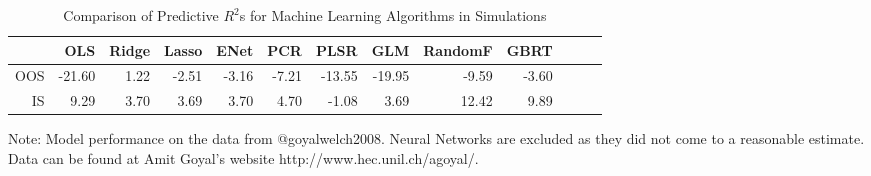 \documentclass{article}
\begin{document}
\begin{table}[ht]
\begin{threeparttable}
\centering
\setlength{\tabcolsep}{12pt}
\caption{Comparison of Predictive $R^2$s for Machine Learning Algorithms in Simulations}
\begin{tabular}{rrrrrrrrrrrrr}
  \hline
 & OLS & Ridge & Lasso & ENet & PCR & PLSR & GLM & RandomF & GBRT\\ 
  \hline
OOS & -21.60 & 1.22 & -2.51 & -3.16 & -7.21 & -13.55 & -19.95 & -9.59 & -3.60 \\
IS & 9.29 & 3.70 & 3.69 & 3.70 & 4.70 & -1.08 & 3.69 & 12.42 & 9.89  \\ 
   \hline
\end{tabular}
\begin{tablenotes}
      \small
      \item Note: Model performance on the data from @goyalwelch2008. Neural Networks are excluded as they did not come to a reasonable estimate. Data can be found at Amit Goyal's website http://www.hec.unil.ch/agoyal/.
    \end{tablenotes}
  \end{threeparttable}
\end{table}
\end{document}

